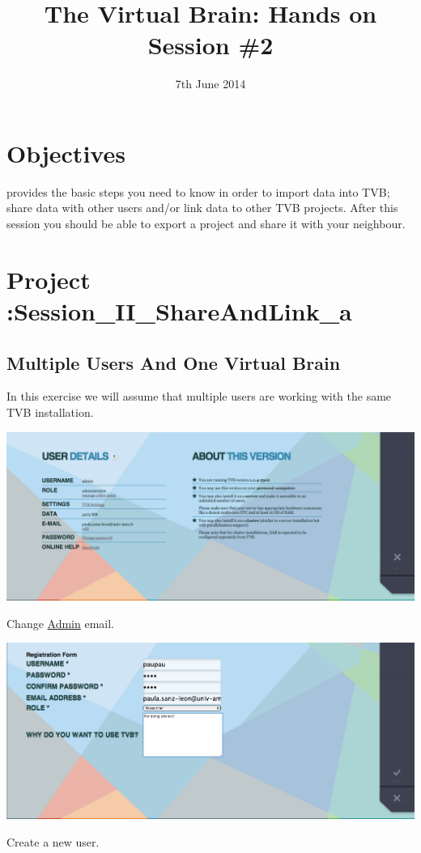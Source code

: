 \documentclass{tufte-handout}
\title{The Virtual Brain: Hands on Session \#2}
\date{7th June 2014}
\begin{document}

\newpage
\ClearWallPaper

\section{Objectives}\label{sec:objectives}

 provides the basic steps you need to know in order to import data into TVB; share data with other users and/or link data to other TVB projects.
After this session you should be able to export a project and share it with your neighbour. 

\section{Project :Session\_II\_ShareAndLink\_a}\label{sec:project_data}

\subsection{Multiple Users And One Virtual Brain}\label{sec:multiusers}
In this exercise we will assume that multiple users are working with the same TVB installation. 



\begin{marginfigure}
  \includegraphics[width=\linewidth]{Handout_UI_LinkAndShare_ChangeAdminEmail}%
  \caption{Change \underline{Admin} email.}%
  \label{fig:change_email}%
\end{marginfigure}

\begin{marginfigure}
  \includegraphics[width=\linewidth]{Handout_UI_LinkAndShare_AddNewUser}%
  \caption{Create a new user.}%
  \label{fig:new_user}%
\end{marginfigure}
\end{document}
